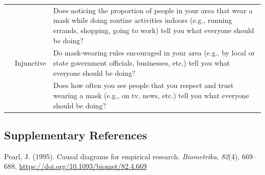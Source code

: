 \documentclass[
  man, donotrepeattitle,floatsintext]{apa6}
\begin{document}
\begin{center}
\begin{ThreePartTable}
\begin{longtable}{m{2.5cm}m{2.5cm}m{9cm}}
 &  & Does noticing the proportion of people in your area that wear a mask while doing routine activities indoors (e.g., running errands, shopping, going to work) tell you what everyone should be doing?\\
 & Injunctive & Do mask-wearing rules encouraged in your area (e.g., by local or state government officials, businesses, etc.) tell you what everyone should be doing?\\
 &  & Does how often you see people that you respect and trust wearing a mask (e.g., on tv, news, etc.) tell you what everyone should be doing?\\
\bottomrule
\end{longtable}

\end{ThreePartTable}
\end{center}

\newpage

\hypertarget{supplementary-references}{%
\subsection{Supplementary References}\label{supplementary-references}}

Pearl, J. (1995). Causal diagrams for empirical research. \emph{Biometrika}, \emph{82}(4), 669--688, \url{https://doi.org/10.1093/biomet/82.4.669}
\end{document}
